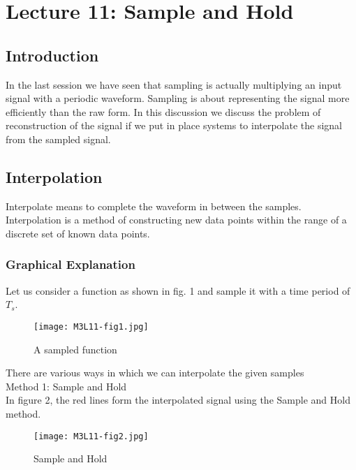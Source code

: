 \section{Lecture 11: Sample and Hold}

\subsection{Introduction}
In the last session we have seen that sampling is actually multiplying an input signal with a periodic waveform. Sampling is about representing the signal more efficiently than the raw form. 
In this discussion we discuss the problem of reconstruction of the signal if we put in place systems to interpolate the signal from the sampled signal.

\subsection{Interpolation}
\label{sec:Graphical explanation}
Interpolate means to complete the waveform in between the samples. Interpolation is a method of constructing new data points within the range of a discrete set of known data points.

\subsubsection{Graphical Explanation}

Let us consider a function as shown in fig. 1 and sample it with a time period of $T_{s}$.

\begin{figure}[ht]
\centering
\texttt{[image: M3L11-fig1.jpg]}
\caption{\label{fig:1} A sampled function}
\end{figure}

There are various ways in which we can interpolate the given samples\\


\noindent Method 1: Sample and Hold\\
\noindent In figure 2, the red lines form the interpolated signal using the Sample and Hold method.

\begin{figure}[ht]
\centering
\texttt{[image: M3L11-fig2.jpg]}
\caption{\label{fig:2} Sample and Hold}
\end{figure}


